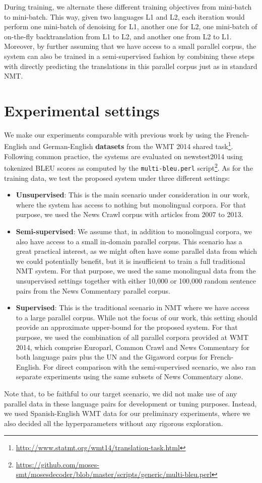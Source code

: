 \documentclass{article} \usepackage{iclr2018_conference,times}
\begin{document}
During training, we alternate these different training objectives from mini-batch to mini-batch. This way, given two languages L1 and L2, each iteration would perform one mini-batch of denoising for L1, another one for L2, one mini-batch of on-the-fly backtranslation from L1 to L2, and another one from L2 to L1. Moreover, by further assuming that we have access to a small parallel corpus, the system can also be trained in a semi-supervised fashion by combining these steps with directly predicting the translations in this parallel corpus just as in standard NMT.


\section{Experimental settings} 
\label{sec:experimental_settings}

We make our experiments comparable with previous work by using the French-English and German-English \textbf{datasets} from the WMT 2014 shared task\footnote{\url{http://www.statmt.org/wmt14/translation-task.html}}. Following common practice, the systems are evaluated on newstest2014 using tokenized BLEU scores as computed by the \texttt{multi-bleu.perl} script\footnote{\url{https://github.com/moses-smt/mosesdecoder/blob/master/scripts/generic/multi-bleu.perl}}. As for the training data, we test the proposed system under three different settings:
\begin{itemize}
\item \textbf{Unsupervised}: This is the main scenario under consideration in our work, where the system has access to nothing but monolingual corpora. For that purpose, we used the News Crawl corpus with articles from 2007 to 2013.
\item \textbf{Semi-supervised}: We assume that, in addition to monolingual corpora, we also have access to a small in-domain parallel corpus. This scenario has a great practical interest, as we might often have some parallel data from which we could potentially benefit, but it is insufficient to train a full traditional NMT system. For that purpose, we used the same monolingual data from the unsupervised settings together with either 10,000 or 100,000 random sentence pairs from the News Commentary parallel corpus.
\item \textbf{Supervised}: This is the traditional scenario in NMT where we have access to a large parallel corpus. While not the focus of our work, this setting should provide an approximate upper-bound for the proposed system. For that purpose, we used the combination of all parallel corpora provided at WMT 2014, which comprise Europarl, Common Crawl and News Commentary for both language pairs plus the UN and the Gigaword corpus for French-English. For direct comparison with the semi-supervised scenario, we also ran separate experiments using the same subsets of News Commentary alone.
\end{itemize}
Note that, to be faithful to our target scenario, we did not make use of any parallel data in these language pairs for development or tuning purposes. Instead, we used Spanish-English WMT data for our preliminary experiments, where we also decided all the hyperparameters without any rigorous exploration.
\end{document}
